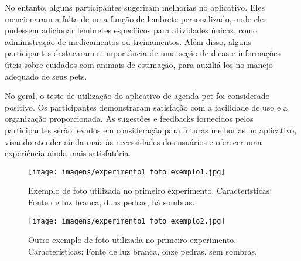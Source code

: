 No entanto, alguns participantes sugeriram melhorias no aplicativo. Eles mencionaram a falta de uma função de lembrete personalizado, onde eles pudessem adicionar lembretes específicos para atividades únicas, como administração de medicamentos ou treinamentos. Além disso, alguns participantes destacaram a importância de uma seção de dicas e informações úteis sobre cuidados com animais de estimação, para auxiliá-los no manejo adequado de seus pets.

No geral, o teste de utilização do aplicativo de agenda pet foi considerado positivo. Os participantes demonstraram satisfação com a facilidade de uso e a organização proporcionada. As sugestões e feedbacks fornecidos pelos participantes serão levados em consideração para futuras melhorias no aplicativo, visando atender ainda mais às necessidades dos usuários e oferecer uma experiência ainda mais satisfatória.







\begin{figure}[tbh]
\texttt{[image: imagens/experimento1\_foto\_exemplo1.jpg]}
\centering
\caption[Exemplo de foto utilizada no primeiro experimento]{Exemplo de foto utilizada no primeiro experimento. Características: Fonte de luz branca, duas pedras, há sombras.}
\label{fig:experimento1-foto-exemplo1}
\end{figure}

\begin{figure}[tbh]
\texttt{[image: imagens/experimento1\_foto\_exemplo2.jpg]}
\centering
\caption[Outro exemplo de foto utilizada no primeiro experimento]{Outro exemplo de foto utilizada no primeiro experimento. Características: Fonte de luz branca, onze pedras, sem sombras.}
\label{fig:experimento1-foto-exemplo2}
\end{figure}



